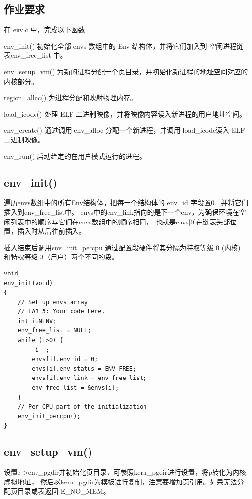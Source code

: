 \documentclass[12pt,a4paper,UTF8]{article}
\begin{document}
    \subsection{作业要求}
    在 env.c 中，完成以下函数

    env\_init() 初始化全部 envs 数组中的 Env 结构体，并将它们加入到 空闲进程链表env\_free\_list 中。

    env\_setup\_vm() 为新的进程分配一个页目录，并初始化新进程的地址空间对应的内核部分。

    region\_alloc() 为进程分配和映射物理内存。

    load\_icode() 处理 ELF 二进制映像，并将映像内容读入新进程的用户地址空间。

    env\_create() 通过调用 env\_alloc 分配一个新进程，并调用 load\_icode读入 ELF 二进制映像。

    env\_run() 启动给定的在用户模式运行的进程。

    \subsection{env\_init()}

    遍历envs数组中的所有Env结构体，把每一个结构体的 env\_id 字段置0，并将它们插入到env\_free\_list中。
    envs中的env\_link指向的是下一个env，为确保环境在空闲列表中的顺序与它们在envs数组中的顺序相同，
    也就是envs[0]在链表头部位置，插入时从后往前插入。

    插入结束后调用env\_init\_percpu 通过配置段硬件将其分隔为特权等级 0 (内核) 和特权等级 3（用户）两个不同的段。

    \begin{lstlisting}[style=CPP]
void
env_init(void)
{
    // Set up envs array
    // LAB 3: Your code here.
    int i=NENV;
    env_free_list = NULL;
    while (i>0) {
         i--;
        envs[i].env_id = 0;
        envs[i].env_status = ENV_FREE;
        envs[i].env_link = env_free_list;
        env_free_list = &envs[i];
    }
    // Per-CPU part of the initialization
    env_init_percpu();
}
\end{lstlisting}

    \subsection{env\_setup\_vm()}

    设置e->env\_pgdir并初始化页目录，可参照kern\_pgdir进行设置，将p转化为内核虚拟地址，
    然后以kern\_pgdir为模板进行复制，注意要增加页引用。如果无法分配页目录或表返回-E\_NO\_MEM。
\end{document}
